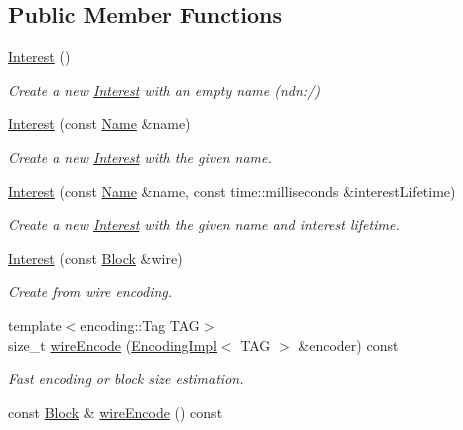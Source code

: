 \subsection*{Public Member Functions}
\begin{DoxyCompactItemize}
\item 
\hyperlink{classndn_1_1Interest_a39e43c111280351431a24c70453b206e}{Interest} ()
\begin{DoxyCompactList}\small\item\em Create a new \hyperlink{classndn_1_1Interest}{Interest} with an empty name ({\ttfamily ndn\+:/}) \end{DoxyCompactList}\item 
\hyperlink{classndn_1_1Interest_acefeb96bcb88d27a13b95336346174a2}{Interest} (const \hyperlink{classndn_1_1Name}{Name} \&name)
\begin{DoxyCompactList}\small\item\em Create a new \hyperlink{classndn_1_1Interest}{Interest} with the given name. \end{DoxyCompactList}\item 
\hyperlink{classndn_1_1Interest_adf4757755b9d52f4f7ec06998cb9d23b}{Interest} (const \hyperlink{classndn_1_1Name}{Name} \&name, const time\+::milliseconds \&interest\+Lifetime)
\begin{DoxyCompactList}\small\item\em Create a new \hyperlink{classndn_1_1Interest}{Interest} with the given name and interest lifetime. \end{DoxyCompactList}\item 
\hyperlink{classndn_1_1Interest_a264f6a6b64e7bd0d1c4f95c40b36cd00}{Interest} (const \hyperlink{classndn_1_1Block}{Block} \&wire)
\begin{DoxyCompactList}\small\item\em Create from wire encoding. \end{DoxyCompactList}\item 
{\footnotesize template$<$encoding\+::\+Tag T\+AG$>$ }\\size\+\_\+t \hyperlink{classndn_1_1Interest_afafc63fc299434ebf1261b306d439f8d}{wire\+Encode} (\hyperlink{classndn_1_1encoding_1_1EncodingImpl}{Encoding\+Impl}$<$ T\+AG $>$ \&encoder) const\hypertarget{classndn_1_1Interest_afafc63fc299434ebf1261b306d439f8d}{}\label{classndn_1_1Interest_afafc63fc299434ebf1261b306d439f8d}

\begin{DoxyCompactList}\small\item\em Fast encoding or block size estimation. \end{DoxyCompactList}\item 
const \hyperlink{classndn_1_1Block}{Block} \& \hyperlink{classndn_1_1Interest_ae68f6c84a5465564397940998f6f00fa}{wire\+Encode} () const\hypertarget{classndn_1_1Interest_ae68f6c84a5465564397940998f6f00fa}{}\label{classndn_1_1Interest_ae68f6c84a5465564397940998f6f00fa}


\end{DoxyCompactItemize}
